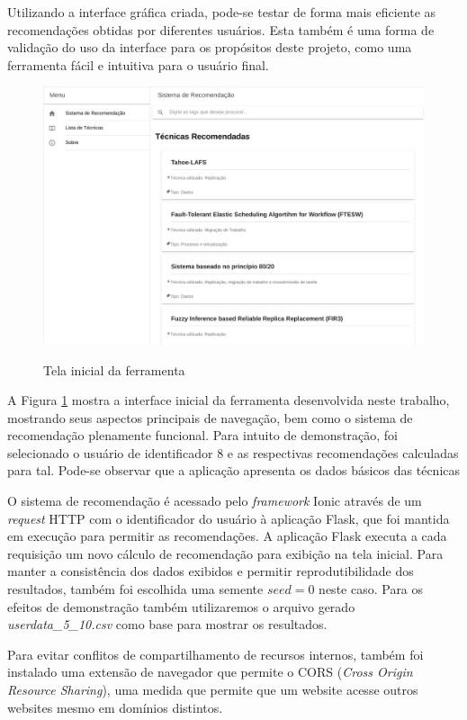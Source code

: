 \documentclass[
	12pt,				%
	oneside,			%
	a4paper,			%
	chapter=TITLE,		%
	english,			%
	french,				%
	spanish,			%
	brazil				%
	]{abntex2}
\begin{document}
Utilizando a interface gráfica criada, pode-se testar de forma mais eficiente as recomendações obtidas por diferentes usuários. Esta também é uma forma de validação do uso da interface para os propósitos deste projeto, como uma ferramenta fácil e intuitiva para o usuário final.

\begin{figure}[H]
    \centering
    \caption{Tela inicial da ferramenta}
    \includegraphics[scale=1.5]{images/sist_recomend.png}
    \label{fig:sisrec_teste}
    \\
\end{figure}

A Figura \ref{fig:sisrec_teste} mostra a interface inicial da ferramenta desenvolvida neste trabalho, mostrando seus aspectos principais de navegação, bem como o sistema de recomendação plenamente funcional. Para intuito de demonstração, foi selecionado o usuário de identificador 8 e as respectivas recomendações calculadas para tal. Pode-se observar que a aplicação apresenta os dados básicos das técnicas 

O sistema de recomendação é acessado pelo \emph{framework} Ionic através de um \emph{request} HTTP com o identificador do usuário à aplicação Flask, que foi mantida em execução para permitir as recomendações. A aplicação Flask executa a cada requisição um novo cálculo de recomendação para exibição na tela inicial. Para manter a consistência dos dados exibidos e permitir reprodutibilidade dos resultados, também foi escolhida uma semente $seed = 0$ neste caso. Para os efeitos de demonstração também utilizaremos o arquivo gerado \emph{userdata\_5\_10.csv} como base para mostrar os resultados.

Para evitar conflitos de compartilhamento de recursos internos, também foi instalado uma extensão de navegador que permite o CORS (\emph{Cross Origin Resource Sharing}), uma medida que permite que um website acesse outros websites mesmo em domínios distintos.
\end{document}
